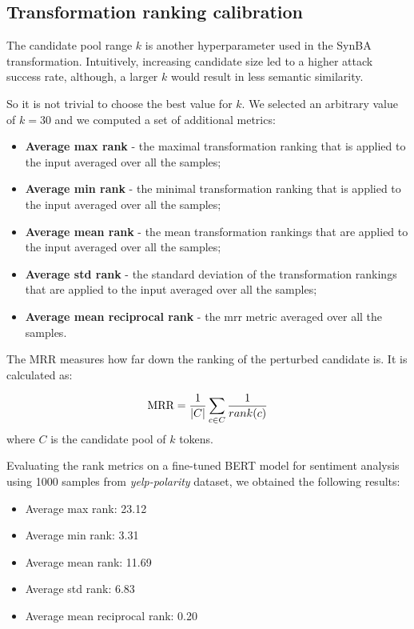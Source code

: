 
\subsection{Transformation ranking calibration}\label{subsec:transformation-ranking-calibration}
The candidate pool range $k$ is another hyperparameter used in the SynBA transformation.
Intuitively, increasing candidate size led to a higher attack success rate, although, a larger 
$k$ would result in less semantic similarity.

So it is not trivial to choose the best value for $k$. 
We selected an arbitrary value of $k=30$ and we computed a set of additional metrics:

\begin{itemize}
    \item \textbf{Average max rank} - the maximal transformation ranking that is applied to the input averaged over all the samples;
    \item \textbf{Average min rank} - the minimal transformation ranking that is applied to the input averaged over all the samples;
    \item \textbf{Average mean rank} - the mean transformation rankings that are applied to the input averaged over all the samples;
    \item \textbf{Average std rank} - the standard deviation of the transformation rankings that are applied to the input averaged over all the samples;
    \item \textbf{Average mean reciprocal rank} - the \acrshort{mrr} metric averaged over all the samples.
\end{itemize}
The MRR measures how far down the ranking of the perturbed candidate is. It is calculated as:

\begin{equation}
    \text{MRR} = \frac{1}{|C|} \sum_{c \in C} \frac{1}{rank(c)} \\
\end{equation}
where $C$ is the candidate pool of $k$ tokens. 


Evaluating the rank metrics on a fine-tuned BERT model for sentiment analysis using 1000 samples from \emph{yelp-polarity} dataset, 
we obtained the following results:
\begin{itemize}
    \item Average max rank: 23.12
    \item Average min rank: 3.31
    \item Average mean rank: 11.69
    \item Average std rank: 6.83
    \item Average mean reciprocal rank: 0.20
\end{itemize}

